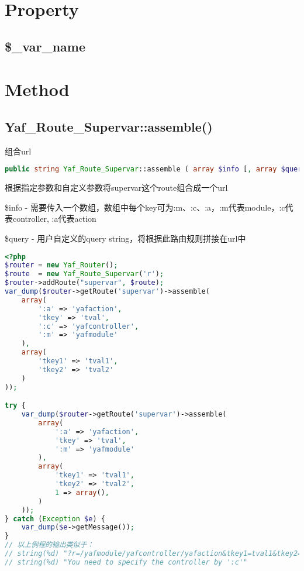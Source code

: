 \section{Property}


\subsection{\$\_var\_name}


\section{Method}


\subsection{Yaf\_Route\_Supervar::assemble()}


组合url


\begin{lstlisting}[language=PHP]
public string Yaf_Route_Supervar::assemble ( array $info [, array $query ] )
\end{lstlisting}

根据指定参数和自定义参数将supervar这个route组合成一个url

\begin{compactitem}
\item \$info - 需要传入一个数组，数组中每个key可为:m、:c、:a，:m代表module，:c代表controller, :a代表action

\item \$query - 用户自定义的query string，将根据此路由规则拼接在url中

\end{compactitem}



\begin{lstlisting}[language=PHP]
<?php
$router = new Yaf_Router();
$route  = new Yaf_Route_Supervar('r');
$router->addRoute("supervar", $route);
var_dump($router->getRoute('supervar')->assemble(
    array(
        ':a' => 'yafaction',
        'tkey' => 'tval',
        ':c' => 'yafcontroller',
        ':m' => 'yafmodule'
    ),
    array(
        'tkey1' => 'tval1',
        'tkey2' => 'tval2'
    )
));

try {
    var_dump($router->getRoute('supervar')->assemble(
        array(
            ':a' => 'yafaction',
            'tkey' => 'tval',
            ':m' => 'yafmodule'
        ),
        array(
            'tkey1' => 'tval1',
            'tkey2' => 'tval2',
            1 => array(),
        )
    ));
} catch (Exception $e) {
    var_dump($e->getMessage());
}
// 以上例程的输出类似于：
// string(%d) "?r=/yafmodule/yafcontroller/yafaction&tkey1=tval1&tkey2=tval2"
// string(%d) "You need to specify the controller by ':c'"
\end{lstlisting}

